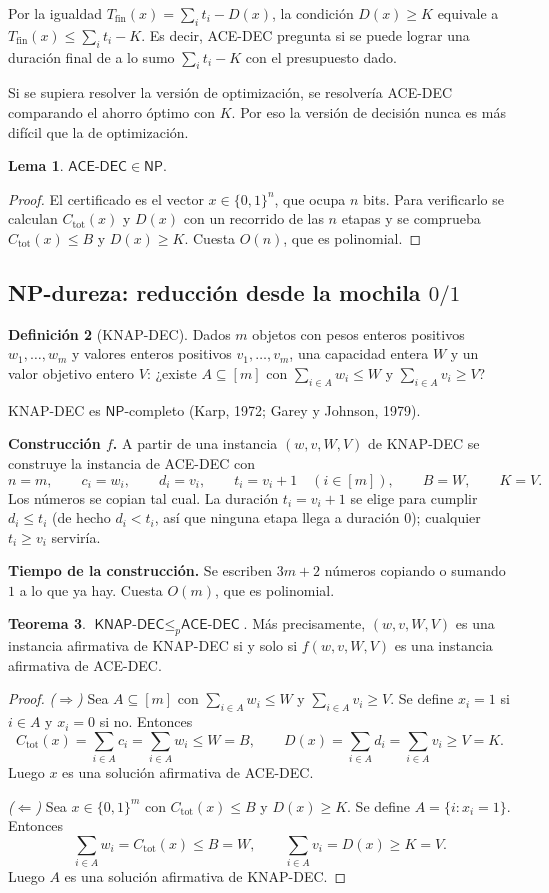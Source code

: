\documentclass[11pt,a4paper]{article}
\theoremstyle{definition}
\newtheorem{definicion}{Definición}[section]
\newtheorem{teorema}[definicion]{Teorema}
\newtheorem{lema}[definicion]{Lema}
\newcommand{\Tfin}{T_{\mathrm{fin}}}
\newcommand{\Ctot}{C_{\mathrm{tot}}}
\newcommand{\ACE}{\textsf{ACE-DEC}}
\newcommand{\KNAP}{\textsf{KNAP-DEC}}
\newcommand{\NP}{\mathsf{NP}}
\newcommand{\pol}{\le_p}
\begin{document}
Por la igualdad $\Tfin(x)=\sum_i t_i-D(x)$, la condición $D(x)\ge K$ equivale a $\Tfin(x)\le \sum_i t_i-K$. Es decir, \ACE{} pregunta si se puede lograr una duración final de a lo sumo $\sum_i t_i-K$ con el presupuesto dado.

Si se supiera resolver la versión de optimización, se resolvería \ACE{} comparando el ahorro óptimo con $K$. Por eso la versión de decisión nunca es más difícil que la de optimización.

\begin{lema}
$\ACE\in\NP$.
\end{lema}
\begin{proof}
El certificado es el vector $x\in\{0,1\}^n$, que ocupa $n$ bits. Para verificarlo se calculan $\Ctot(x)$ y $D(x)$ con un recorrido de las $n$ etapas y se comprueba $\Ctot(x)\le B$ y $D(x)\ge K$. Cuesta $O(n)$, que es polinomial.
\end{proof}

\subsection{NP-dureza: reducción desde la mochila $0/1$}

\begin{definicion}[\KNAP]
Dados $m$ objetos con pesos enteros positivos $w_1,\dots,w_m$ y valores enteros positivos $v_1,\dots,v_m$, una capacidad entera $W$ y un valor objetivo entero $V$: ¿existe $A\subseteq[m]$ con $\sum_{i\in A}w_i\le W$ y $\sum_{i\in A}v_i\ge V$?
\end{definicion}

\KNAP{} es $\NP$-completo (Karp, 1972; Garey y Johnson, 1979).

\textbf{Construcción $f$.} A partir de una instancia $(w,v,W,V)$ de \KNAP{} se construye la instancia de \ACE{} con
\[
n=m,\qquad c_i=w_i,\qquad d_i=v_i,\qquad t_i=v_i+1\quad(i\in[m]),\qquad B=W,\qquad K=V .
\]
Los números se copian tal cual. La duración $t_i=v_i+1$ se elige para cumplir $d_i\le t_i$ (de hecho $d_i<t_i$, así que ninguna etapa llega a duración $0$); cualquier $t_i\ge v_i$ serviría.

\textbf{Tiempo de la construcción.} Se escriben $3m+2$ números copiando o sumando $1$ a lo que ya hay. Cuesta $O(m)$, que es polinomial.

\begin{teorema}\label{teo:p1}
$\KNAP\pol\ACE$. Más precisamente, $(w,v,W,V)$ es una instancia afirmativa de \KNAP{} si y solo si $f(w,v,W,V)$ es una instancia afirmativa de \ACE.
\end{teorema}
\begin{proof}
\emph{($\Rightarrow$)} Sea $A\subseteq[m]$ con $\sum_{i\in A}w_i\le W$ y $\sum_{i\in A}v_i\ge V$. Se define $x_i=1$ si $i\in A$ y $x_i=0$ si no. Entonces
\[
\Ctot(x)=\sum_{i\in A}c_i=\sum_{i\in A}w_i\le W=B,
\qquad
D(x)=\sum_{i\in A}d_i=\sum_{i\in A}v_i\ge V=K .
\]
Luego $x$ es una solución afirmativa de \ACE.

\emph{($\Leftarrow$)} Sea $x\in\{0,1\}^m$ con $\Ctot(x)\le B$ y $D(x)\ge K$. Se define $A=\{i: x_i=1\}$. Entonces
\[
\sum_{i\in A}w_i=\Ctot(x)\le B=W,
\qquad
\sum_{i\in A}v_i=D(x)\ge K=V .
\]
Luego $A$ es una solución afirmativa de \KNAP.
\end{proof}
\end{document}
